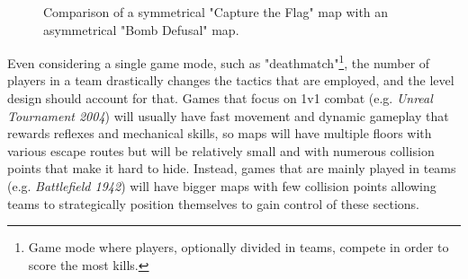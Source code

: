 \begin{figure}[hbt!]
    \centering
    \quad
    \caption[Map comparison]{Comparison of a symmetrical "Capture the Flag" map with an asymmetrical "Bomb Defusal" map.}
    \label{fig:maps_compare}
\end{figure}

Even considering a single game mode, such as "deathmatch"\footnote{Game mode where players, optionally divided in teams, compete in order to score the most kills.}, the number of players in a team drastically changes the tactics that are employed, and the level design should account for that. Games that focus on 1v1 combat (e.g. \textit{Unreal Tournament 2004}) will usually have fast movement and dynamic gameplay that rewards reflexes and mechanical skills, so maps will have multiple floors with various escape routes but will be relatively small and with numerous collision points that make it hard to hide. Instead, games that are mainly played in teams (e.g. \textit{Battlefield 1942}) will have bigger maps with few collision points allowing teams to strategically position themselves to gain control of these sections.

